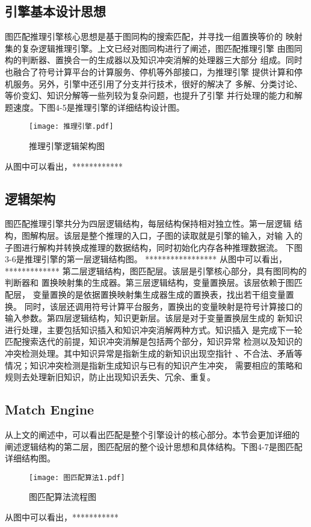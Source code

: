 \documentclass{standalone}
\begin{document}
\subsection{引擎基本设计思想}
图匹配推理引擎核心思想是基于图同构的搜索匹配，并寻找一组置换等价的
映射集的复杂逻辑推理引擎。上文已经对图同构进行了阐述，图匹配推理引擎
由图同构的判断器、置换合一的生成器以及知识冲突消解的处理器三大部分
组成。同时也融合了符号计算平台的计算服务、停机等外部接口，为推理引擎
提供计算和停机服务。另外，引擎中还引用了分支并行技术，很好的解决了
多解、分类讨论、等价变幻、知识分解等一些列较为复杂问题，也提升了引擎
并行处理的能力和解题速度。下图4-5是推理引擎的详细结构设计图。

\begin{figure}[htbp]
	\texttt{[image: 推理引擎.pdf]}
	\caption{推理引擎逻辑架构图}
	\label{推理引擎}
\end{figure}
从图中可以看出，************

\subsection{逻辑架构}
图匹配推理引擎共分为四层逻辑结构，每层结构保持相对独立性。第一层逻辑
结构，图解构层。该层是整个推理的入口，子图的读取就是引擎的输入，对输
入的子图进行解构并转换成推理的数据结构，同时初始化内存各种推理数据流。
下图3-6是推理引擎的第一层逻辑结构图。
*****************
从图中可以看出，*************
第二层逻辑结构，图匹配层。该层是引擎核心部分，具有图同构的判断器和
置换映射集的生成器。第三层逻辑结构，变量置换层。该层依赖于图匹配层，
变量置换的是依据置换映射集生成器生成的置换表，找出若干组变量置换。
同时，该层还调用符号计算平台服务，置换出的变量映射是符号计算接口的
输入参数。第四层逻辑结构，知识更新层。该层是对于变量置换层生成的
新知识进行处理，主要包括知识插入和知识冲突消解两种方式。知识插入
是完成下一轮匹配搜索迭代的前提，知识冲突消解是包括两个部分，知识异常
检测以及知识的冲突检测处理。其中知识异常是指新生成的新知识出现空指针
、不合法、矛盾等情况；知识冲突检测是指新生成知识与已有的知识产生冲突，
需要相应的策略和规则去处理新旧知识，防止出现知识丢失、冗余、重复。

\subsection{Match Engine}
从上文的阐述中，可以看出匹配是整个引擎设计的核心部分。本节会更加详细的
阐述逻辑结构的第二层，图匹配层的整个设计思想和具体结构。下图4-7是图匹配
详细结构图。

\begin{figure}[htbp]
	\texttt{[image: 图匹配算法1.pdf]}
	\caption{图匹配算法流程图}
	\label{图匹配算法1}
\end{figure}
从图中可以看出，***********
\end{document}
